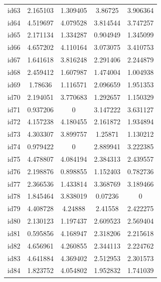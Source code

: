 \documentclass[num-refs]{wiley-article}
\begin{document}
\begin{center}
\begin{longtable}{ccccc}
id63      & 2.165103  & 1.309405       & 3.86725           & 3.906364          \\
id64      & 4.519697  & 4.079528       & 3.814544          & 3.747257          \\
id65      & 2.171134  & 1.334287       & 0.904949          & 1.345099          \\
id66      & 4.657202  & 4.110164       & 3.073075          & 3.410753          \\
id67      & 1.641618  & 3.816248       & 2.291406          & 2.244879          \\
id68      & 2.459412  & 1.607987       & 1.474004          & 1.004938          \\
id69      & 1.78636   & 1.116571       & 2.096659          & 1.951353          \\
id70      & 2.194051  & 3.770683       & 1.292657          & 1.150329          \\
id71      & 0.937206  & 0              & 3.147222          & 3.631127          \\
id72      & 4.157238  & 4.180455       & 2.161872          & 1.934894          \\
id73      & 4.303307  & 3.899757       & 1.25871           & 1.130212          \\
id74      & 0.979422  & 0              & 2.889941          & 3.222385          \\
id75      & 4.478807  & 4.084194       & 2.384313          & 2.439557          \\
id76      & 2.198876  & 0.898855       & 1.152403          & 0.782736          \\
id77      & 2.366536  & 1.433814       & 3.368769          & 3.189466          \\
id78      & 1.845464  & 3.838019       & 0.07236           & 0                 \\
id79      & 4.408728  & 4.24888        & 2.41558           & 2.422275          \\
id80      & 2.130123  & 1.197437       & 2.609523          & 2.569404          \\
id81      & 0.595856  & 4.168947       & 2.318206          & 2.215618          \\
id82      & 4.656961  & 4.260855       & 2.344113          & 2.224762          \\
id83      & 4.641884  & 4.369402       & 2.512953          & 2.301573          \\
id84      & 1.823752  & 4.054802       & 1.952832          & 1.741039          \\

\end{longtable}
\end{center}
\end{document}

